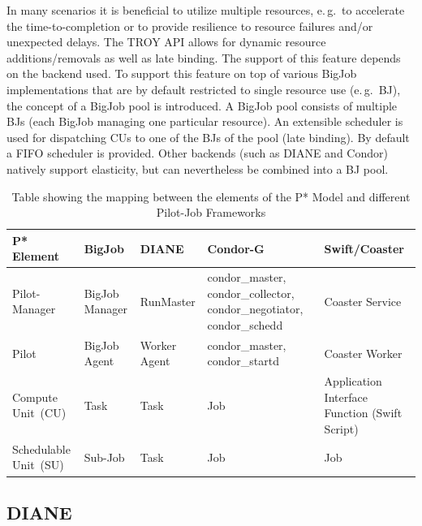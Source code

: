 \documentclass[conference,final]{IEEEtran}
\newcommand{\pilot}{Pilot}
\newcommand{\computeunit}{Compute Unit}
\newcommand{\cu}{CU}
\newcommand{\su}{Schedulable Unit}
\newcommand{\upp}{\vspace*{-0.5em}}
\begin{document}


In many scenarios it is beneficial to utilize multiple resources, e.\,g.\ to
accelerate the time-to-completion or to provide resilience to resource failures
and/or unexpected delays. The TROY API allows for dynamic resource
additions/removals as well as late binding. The support of this feature depends
on the backend used. To support this feature on top of various BigJob
implementations that are by default restricted to single resource use (e.\,g.\
BJ), the concept of a BigJob pool is introduced. A BigJob pool consists of
multiple BJs (each BigJob managing one particular resource). An extensible
scheduler is used for dispatching \cu s to one of the BJs of the pool (late
binding). By default a FIFO scheduler is provided. Other backends (such as DIANE
and Condor) natively support elasticity, but can nevertheless be combined into a
BJ pool.

% 
\upp

\begin{table}[t]
\centering
\begin{tabular}{|p{2.5cm}|p{3cm}|p{3cm}|p{3cm}|p{3cm}|}
  \hline
  \textbf{P* Element} &\textbf{BigJob} &\textbf{DIANE} &\textbf{Condor-G} &\textbf{Swift/Coaster}  \\
  \hline
  Pilot-Manager &BigJob Manager & RunMaster & condor\_master, condor\_collector, condor\_negotiator, condor\_schedd &Coaster Service\\ 
  \hline
  \pilot &BigJob Agent  & Worker Agent &condor\_master, condor\_startd &Coaster Worker\\
  \hline
  \computeunit  \ (CU) &Task &Task &Job &Application Interface Function (Swift Script)\\
  \hline
  \su \ (SU) &Sub-Job &Task &Job &Job\\
\hline
\end{tabular}
\caption{Table showing the mapping between the elements of the P* Model and different Pilot-Job Frameworks\upp\upp} \label{table:bigjob-saga-diane}
\end{table}

\upp
\subsection{DIANE\upp\upp}
\end{document}
